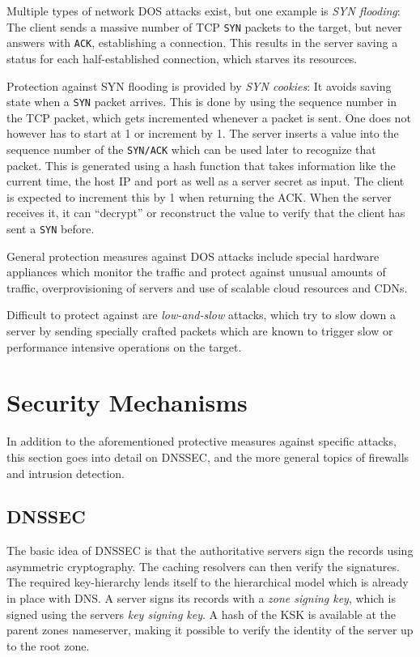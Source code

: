 Multiple types of network DOS attacks exist, but one example is \emph{SYN
    flooding}: The client sends a massive number of TCP \texttt{SYN} packets to
    the target, but never answers with \texttt{ACK}, establishing a connection.
    This results in the server saving a status for each half-established
    connection, which starves its resources.

Protection against SYN flooding is provided by \emph{SYN cookies}: It avoids
saving state when a \texttt{SYN} packet arrives. This is done by using the
sequence number in the TCP packet, which gets incremented whenever a packet is
sent. One does not however has to start at 1 or increment by 1. The server
inserts a value into the sequence number of the \texttt{SYN/ACK} which can be
used later to recognize that packet. This is generated using a hash function
that takes information like the current time, the host IP and port as well as a
server secret as input. The client is expected to increment this by 1 when
returning the ACK. When the server receives it, it can ``decrypt'' or
reconstruct the value to verify that the client has sent a \texttt{SYN} before.

General protection measures against DOS attacks include special hardware
appliances which monitor the traffic and protect against unusual amounts of
traffic, overprovisioning of servers and use of scalable cloud resources and
CDNs.

Difficult to protect against are \emph{low-and-slow} attacks, which try to slow
down a server by sending specially crafted packets which are known to trigger
slow or performance intensive operations on the target.

\section{Security Mechanisms}

In addition to the aforementioned protective measures against specific attacks,
this section goes into detail on DNSSEC, and the more general topics of
firewalls and intrusion detection.

\subsection{DNSSEC}
\label{sec:dnssec}
The basic idea of DNSSEC is that the authoritative servers sign the records
using asymmetric cryptography. The caching resolvers can then verify the
signatures. The required key-hierarchy lends itself to the hierarchical model
which is already in place with DNS. A server signs its records with a \emph{zone
signing key}, which is signed using the servers \emph{key signing key}. A hash
of the KSK is available at the parent zones nameserver, making it possible to
verify the identity of the server up to the root zone.

